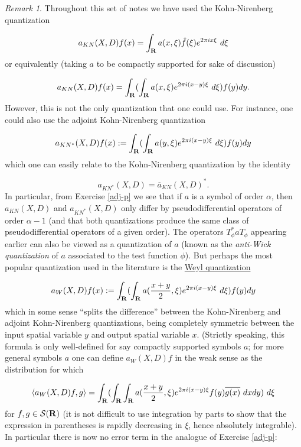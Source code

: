 \documentclass[11pt]{article}
\theoremstyle{definition}
\theoremstyle{remark}
\newtheorem{remark}[theorem]{Remark}
\begin{document}
\begin{remark}
 \label{weyl} Throughout this set of notes we have used the Kohn-Nirenberg quantization 

\[\displaystyle  a_{KN}(X,D) f(x) = \int_{\bf R} a(x,\xi) \hat f(\xi) e^{2\pi i x \xi}\ d\xi\]
 or equivalently (taking \({a}\) to be compactly supported for sake of discussion) 

\[\displaystyle  a_{KN}(X,D) f(x) = \int_{\bf R} (\int_{\bf R} a(x,\xi) e^{2\pi i (x-y) \xi}\ d\xi) f(y) dy.\]
 However, this is not the only quantization that one could use. For instance, one could also use the adjoint Kohn-Nirenberg quantization 

\[\displaystyle  a_{KN^*}(X,D) f(x) := \int_{\bf R} (\int_{\bf R} a(y,\xi) e^{2\pi i (x-y) \xi}\ d\xi) f(y) dy\]
 which one can easily relate to the Kohn-Nirenberg quantization by the identity 

\[\displaystyle  a_{KN^*}(X,D) = \overline{a}_{KN}(X,D)^*.\]
 In particular, from Exercise \ref{adj-p} we see that if \({a}\) is a symbol of order \({\alpha}\), then \({a_{KN}(X,D)}\) and \({a_{KN^*}(X,D)}\) only differ by pseudodifferential operators of order \({\alpha-1}\) (and that both quantizations produce the same class of pseudodifferential operators of a given order). The operators \({T_\phi^* a T_\phi}\) appearing earlier can also be viewed as a quantization of \({a}\) (known as the \emph{anti-Wick quantization} of \({a}\) associated to the test function \({\phi}\)). But perhaps the most popular quantization used in the literature is the \href{https://en.wikipedia.org/wiki/Wigner%E2%80%93Weyl_transform}{Weyl quantization} 

\[\displaystyle  a_{W}(X,D) f(x) := \int_{\bf R} (\int_{\bf R} a(\frac{x+y}{2},\xi) e^{2\pi i (x-y) \xi}\ d\xi) f(y) dy\]
 which in some sense “splits the difference” between the Kohn-Nirenberg and adjoint Kohn-Nirenberg quantizations, being completely symmetric between the input spatial variable \({y}\) and output spatial variable \({x}\). (Strictly speaking, this formula is only well-defined for say compactly supported symbols \({a}\); for more general symbols \({a}\) one can define \({a_W(X,D) f}\) in the weak sense as the distribution for which 

\[\displaystyle  \langle a_{W}(X,D) f, g \rangle = \int_{\bf R} (\int_{\bf R} \int_{\bf R} a(\frac{x+y}{2},\xi) e^{2\pi i (x-y) \xi} f(y) \overline{g(x)}\ dx dy)\ d\xi\]
 for \({f,g \in {\mathcal S}({\bf R})}\) (it is not difficult to use integration by parts to show that the expression in parentheses is rapidly decreasing in \({\xi}\), hence absolutely integrable). In particular there is now no error term in the analogue of Exercise \ref{adj-p}: 


\end{remark}
\end{document}

